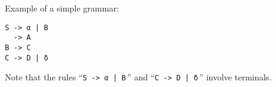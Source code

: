 \documentclass{article}
\begin{document}
\noindent Example of a simple grammar:
\begin{lstlisting}
S -> α | B
  -> A 
B -> C
C -> D | δ
\end{lstlisting}
Note that the rules ``\lstinline{S -> α | B}\,'' and
``\lstinline{C -> D | δ}\,'' involve terminals.
\end{document}
